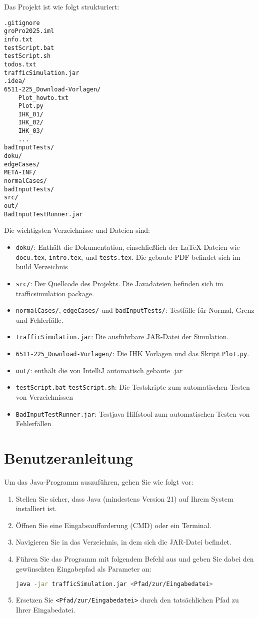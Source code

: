 \documentclass[a4paper,12pt]{report}
\begin{document}
Das Projekt ist wie folgt strukturiert:

\begin{verbatim}
.gitignore
groPro2025.iml
info.txt
testScript.bat
testScript.sh
todos.txt
trafficSimulation.jar
.idea/
6511-225_Download-Vorlagen/
    Plot_howto.txt
    Plot.py
    IHK_01/
    IHK_02/
    IHK_03/
    ...
badInputTests/
doku/
edgeCases/
META-INF/
normalCases/
badInputTests/
src/
out/
BadInputTestRunner.jar
\end{verbatim}

Die wichtigsten Verzeichnisse und Dateien sind:
\begin{itemize}
    \item \texttt{doku/}: Enthält die Dokumentation, einschließlich der LaTeX-Dateien wie \texttt{docu.tex}, \texttt{intro.tex}, und \texttt{tests.tex}. Die gebaute PDF befindet sich im build Verzeichnis
    \item \texttt{src/}: Der Quellcode des Projekts. Die Javadateien befinden sich im trafficsimulation package.
    \item \texttt{normalCases/}, \texttt{edgeCases/} und \texttt{badInputTests/}: Testfälle für Normal, Grenz und Fehlerfälle.
    \item \texttt{trafficSimulation.jar}: Die ausführbare JAR-Datei der Simulation.
    \item \texttt{6511-225\_Download-Vorlagen/}: Die IHK Vorlagen und das Skript \texttt{Plot.py}.
    \item \texttt{out/}: enthält die von IntelliJ automatisch gebaute .jar
    \item \texttt{testScript.bat} \texttt{testScript.sh}: Die Testskripte zum automatischen Testen von Verzeichnissen
    \item \texttt{BadInputTestRunner.jar}: Testjava Hilfstool zum automatischen Testen von Fehlerfällen
\end{itemize}

\chapter{Benutzeranleitung}

Um das Java-Programm auszuführen, gehen Sie wie folgt vor:

\begin{enumerate}
    \item Stellen Sie sicher, dass Java (mindestens Version 21) auf Ihrem System installiert ist.
    \item Öffnen Sie eine Eingabeaufforderung (CMD) oder ein Terminal.
    \item Navigieren Sie in das Verzeichnis, in dem sich die JAR-Datei befindet.
    \item Führen Sie das Programm mit folgendem Befehl aus und geben Sie dabei den gewünschten Eingabepfad als Parameter an:
    \begin{lstlisting}[language=bash]
    java -jar trafficSimulation.jar <Pfad/zur/Eingabedatei>
    \end{lstlisting}
    \item Ersetzen Sie \texttt{<Pfad/zur/Eingabedatei>} durch den tatsächlichen Pfad zu Ihrer Eingabedatei.
\end{enumerate}
\end{document}
